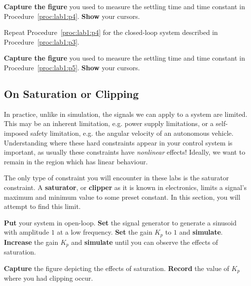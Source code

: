 %
\begin{deliverable}[label={lab1:d4}]
  \textbf{Capture the figure} you used to measure the settling time and
  time constant in Procedure~\ref{proc:lab1:p4}. \textbf{Show} your cursors.
\end{deliverable}
%
\begin{procedure}[label={proc:lab1:p5}]
  Repeat Procedure~\ref{proc:lab1:p4} for the closed-loop system described in
  Procedure~\ref{proc:lab1:p3}.
\end{procedure}
%
\begin{deliverable}[label={lab1:d5}]
  \textbf{Capture the figure} you used to measure the settling time and
  time constant in Procedure~\ref{proc:lab1:p5}. \textbf{Show} your cursors.
\end{deliverable}
%

\subsection{On Saturation or Clipping}
In practice, unlike in simulation, the signals we can apply to a system are
limited. This may be an inherent limitation, e.g.
power supply limitations, or a self-imposed safety limitation, e.g.
the angular velocity of an autonomous vehicle. Understanding where these hard
constraints appear in your control system is important, as usually these
constraints have \emph{nonlinear} effects! Ideally, we want to remain in
the region which has linear behaviour.

The only type of constraint you will encounter in these labs is the saturator
constraint. A \textbf{saturator}, or \textbf{clipper} as it is known in
electronics, limits a signal's maximum and minimum value to some preset
constant. In this section, you will attempt to find this limit.
%
\begin{procedure}[label={proc:lab1:p6}]
  \textbf{Put} your system in open-loop. \textbf{Set} the signal generator to
  generate a sinusoid with amplitude \(1\) at a low frequency.
  \textbf{Set} the gain \(K_p\) to \(1\) and \textbf{simulate}.
  \textbf{Increase} the gain \(K_p\) and \textbf{simulate} until you can
  observe the effects of saturation.
\end{procedure}
%
\begin{deliverable}[label={lab1:d6}]
  \textbf{Capture} the figure depicting the effects of saturation.
  \textbf{Record} the value of \(K_p\) where you had clipping occur.
\end{deliverable}

